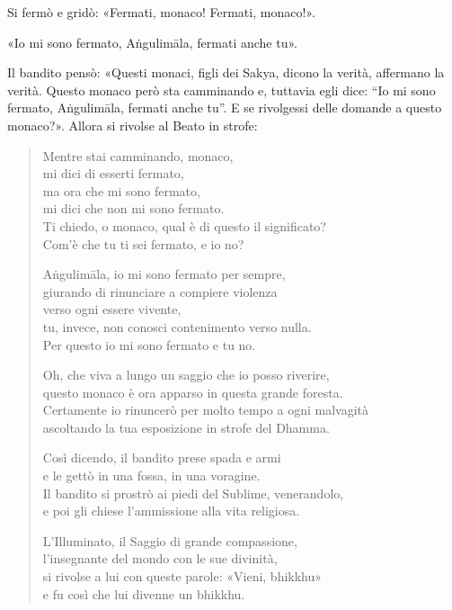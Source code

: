 Si fermò e gridò: «Fermati, monaco! Fermati, monaco!».

«Io mi sono fermato, Aṅgulimāla, fermati anche tu».

Il bandito pensò: «Questi monaci, figli dei Sakya, dicono la verità, affermano
la verità. Questo monaco però sta camminando e, tuttavia egli dice: “Io mi sono
fermato, Aṅgulimāla, fermati anche tu”. E se rivolgessi delle domande a questo
monaco?». Allora si rivolse al Beato in strofe:

\begin{quote}
Mentre stai camminando, monaco, \\
mi dici di esserti fermato, \\
ma ora che mi sono fermato, \\
mi dici che non mi sono fermato. \\
Ti chiedo, o monaco, qual è di questo il significato? \\
Com’è che tu ti sei fermato, e io no?

Aṅgulimāla, io mi sono fermato per sempre, \\
giurando di rinunciare a compiere violenza \\
verso ogni essere vivente, \\
tu, invece, non conosci contenimento verso nulla. \\
Per questo io mi sono fermato e tu no.

Oh, che viva a lungo un saggio che io posso riverire, \\
questo monaco è ora apparso in questa grande foresta. \\
Certamente io rinuncerò per molto tempo a ogni malvagità \\
ascoltando la tua esposizione in strofe del Dhamma.

Così dicendo, il bandito prese spada e armi \\
e le gettò in una fossa, in una voragine. \\
Il bandito si prostrò ai piedi del Sublime, venerandolo, \\
e poi gli chiese l’ammissione alla vita religiosa.

L’Illuminato, il Saggio di grande compassione, \\
l’insegnante del mondo con le sue divinità, \\
si rivolse a lui con queste parole: «Vieni, bhikkhu» \\
e fu così che lui divenne un bhikkhu.
\end{quote}

